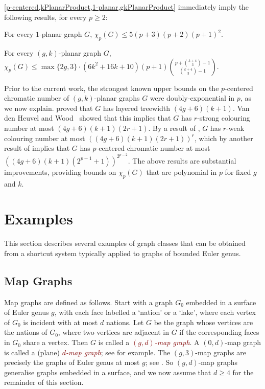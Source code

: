 \documentclass{patmorin}
\newcommand{\defin}[1]{\textcolor{Maroon}{\emph{#1}}}
\newcommand{\note}[2]{\noindent{\color{red}[#1:~#2]}}
\renewcommand{\ge}{\geqslant}
\renewcommand{\le}{\leqslant}
\renewcommand{\geq}{\geqslant}
\begin{document}
\cref{p-centered,kPlanarProduct,1-planar,gkPlanarProduct} immediately imply the following results, for every $p\ge 2$:

\begin{cor}\quad
\begin{compactitem}
\item For every $1$-planar graph $G$,\; $ \chi_p(G)\le 5 (p+3)(p+2)(p+1)^2$.
\item For every $(g,k)$-planar graph $G$,\;
$\displaystyle \chi_p(G) \le \max\{2g,3\}\cdot(6k^2+16k+10) (p+1) \binom{p+\binom{k+4}{3}-1}{\binom{k+4}{3}-1}$.
\note{DW}{I have changed $\binom{k+5}{4}$ to $\binom{k+4}{3}$, okay?}
 \end{compactitem}
\end{cor}

Prior to the current work, the strongest known upper bounds on the $p$-centered chromatic number of $(g,k)$-planar graphs $G$ were doubly-exponential in $p$, as we now explain. \citet{dujmovic.eppstein.ea:structure} proved that $G$ has layered treewidth $(4g+6)(k+1)$.
Van den Heuvel and Wood~\citep{vdHW17} showed that this implies that $G$  has $r$-strong colouring number at most $(4g + 6)(k + 1)(2r + 1)$. By a result of \citet{zhu:colouring}, $G$ has $r$-weak colouring number at most $( (4g + 6)(k + 1)(2r + 1) )^r$, which by another result of  \citet{zhu:colouring} implies that $G$ has  $p$-centered chromatic number at most $( (4g+6)(k+1)(2^{p-1} + 1) )^{2^{p-2}}$. The above results are substantial improvements, providing bounds on $\chi_p(G)$ that are polynomial in $p$ for fixed $g$ and $k$.


\section{Examples}
\label{Examples}

This section describes several examples of graph classes that can be obtained from a shortcut system typically applied to graphs of bounded Euler genus.


\subsection{Map Graphs}

Map graphs are defined as follows. Start with a graph $G_0$ embedded in a surface of Euler genus $g$, with each face labelled a `nation' or a `lake', where each vertex of $G_0$ is incident with at most $d$ nations. Let $G$ be the graph whose vertices are the nations of $G_0$, where two vertices are adjacent in $G$ if the corresponding faces in $G_0$ share a vertex. Then $G$ is called a \defin{$(g,d)$-map graph}.  A $(0,d)$-map graph is called a (plane) \defin{$d$-map graph}; see \citep{FLS-SODA12,CGP02} for example.
The $(g,3)$-map graphs are precisely the graphs of Euler genus at most $g$; see \citep{dujmovic.eppstein.ea:structure}. So $(g,d)$-map graphs generalise graphs embedded in a surface, and we now assume that $d\geq 4$ for the remainder of this section.
\end{document}
